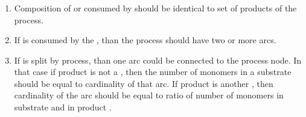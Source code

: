 \subsubsection{}
  \begin{enumerate}
    \item Composition of  or  consumed by
     should be identical to set of products of the process.
    \item If  is consumed by the , than the
    process should have two or more  arcs.
    \item If  is split by  process, than
    one  arc could be connected to the process node. In that case if product is not a
    , then the number of monomers in a substrate 
    should be equal to cardinality of that arc. If product is another
    , then cardinality of the  arc should be equal to
    ratio of number of monomers in substrate and in product .
  \end{enumerate}  
  